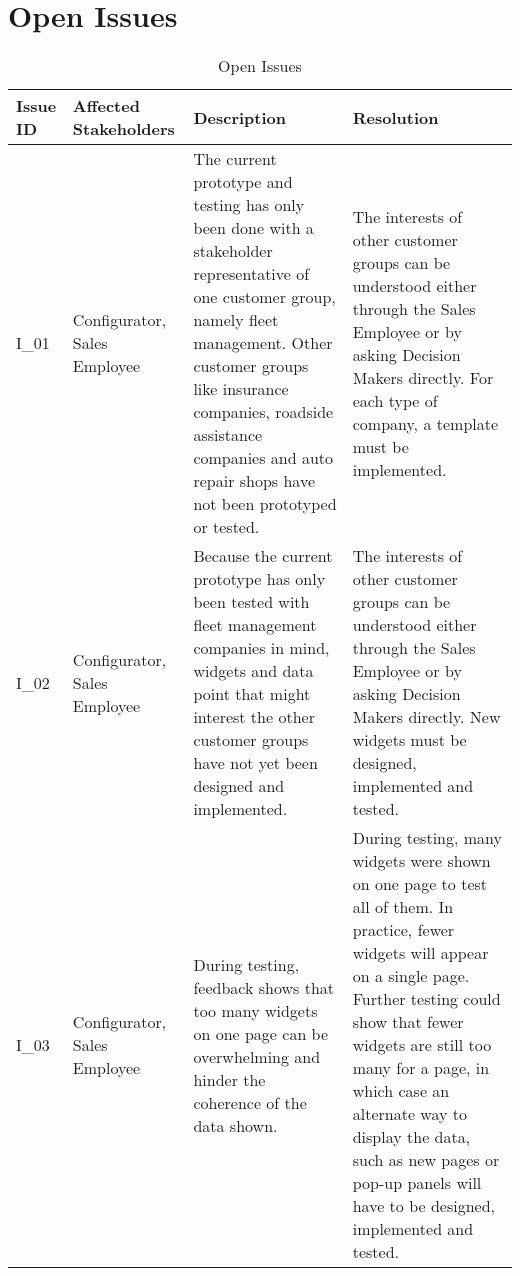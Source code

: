 \chapter{Open Issues}

\sffamily
\begin{footnotesize}
    \begin{longtable}[i L L L]{ p{} p{} p{} p{}}
        \caption                       %
            {Open Issues} %
            \\
        \toprule
        \textbf{Issue ID} & \textbf{Affected Stakeholders} & \textbf{Description} & \textbf{Resolution} \\
        \midrule
        I\_01 & Configurator, Sales Employee & The current prototype and testing has only been done with a stakeholder representative of one customer group, namely fleet management. Other customer groups like insurance companies, roadside assistance companies and auto repair shops have not been prototyped or tested. & The interests of other customer groups can be understood either through the Sales Employee or by asking Decision Makers directly. For each type of company, a template must be implemented. \\
        I\_02 & Configurator, Sales Employee & Because the current prototype has only been tested with fleet management companies in mind, widgets and data point that might interest the other customer groups have not yet been designed and implemented. & The interests of other customer groups can be understood either through the Sales Employee or by asking Decision Makers directly. New widgets must be designed, implemented and tested. \\
        I\_03 & Configurator, Sales Employee & During testing, feedback shows that too many widgets on one page can be overwhelming and hinder the coherence of the data shown. & During testing, many widgets were shown on one page to test all of them. In practice, fewer widgets will appear on a single page. Further testing could show that fewer widgets are still too many for a page, in which case an alternate way to display the data, such as new pages or pop-up panels will have to be designed, implemented and tested. \\
        \bottomrule
    \end{longtable}
\end{footnotesize}
\rmfamily
